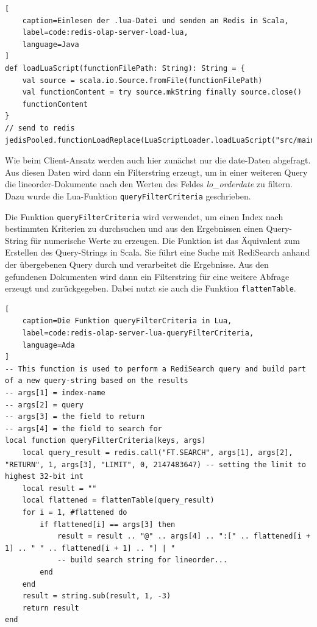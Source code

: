 \begin{lstlisting}[
    caption=Einlesen der .lua-Datei und senden an Redis in Scala,
    label=code:redis-olap-server-load-lua,
    language=Java
]
def loadLuaScript(functionFilePath: String): String = {
	val source = scala.io.Source.fromFile(functionFilePath)
	val functionContent = try source.mkString finally source.close()
	functionContent
}
// send to redis
jedisPooled.functionLoadReplace(LuaScriptLoader.loadLuaScript("src/main/resources/olaplibrary.lua"))
\end{lstlisting}





Wie beim Client-Ansatz werden auch hier zunächst nur die date-Daten abgefragt. Aus diesen Daten wird dann ein Filterstring erzeugt, um in einer weiteren Query die lineorder-Dokumente nach den Werten des Feldes \emph{lo\_orderdate} zu filtern. Dazu wurde die Lua-Funktion \lstinline|queryFilterCriteria| geschrieben.

Die Funktion \lstinline|queryFilterCriteria| wird verwendet, um einen Index nach bestimmten Kriterien zu durchsuchen und aus den Ergebnissen einen Query-String für numerische Werte zu erzeugen. Die Funktion ist das Äquivalent zum Erstellen des Query-Strings in Scala.
Sie führt eine Suche mit RediSearch anhand der übergebenen Query durch und verarbeitet die Ergebnisse. Aus den gefundenen Dokumenten wird dann ein Filterstring für eine weitere Abfrage erzeugt und zurückgegeben. Dabei nutzt sie auch die Funktion \lstinline|flattenTable|.

\begin{lstlisting}[
    caption=Die Funktion queryFilterCriteria in Lua,
    label=code:redis-olap-server-lua-queryFilterCriteria,
    language=Ada
]
-- This function is used to perform a RediSearch query and build part of a new query-string based on the results
-- args[1] = index-name
-- args[2] = query
-- args[3] = the field to return
-- args[4] = the field to search for
local function queryFilterCriteria(keys, args)
    local query_result = redis.call("FT.SEARCH", args[1], args[2], "RETURN", 1, args[3], "LIMIT", 0, 2147483647) -- setting the limit to highest 32-bit int
    local result = ""
    local flattened = flattenTable(query_result)
    for i = 1, #flattened do
        if flattened[i] == args[3] then
            result = result .. "@" .. args[4] .. ":[" .. flattened[i + 1] .. " " .. flattened[i + 1] .. "] | "
            -- build search string for lineorder...
        end
    end
    result = string.sub(result, 1, -3)
    return result
end
\end{lstlisting}

